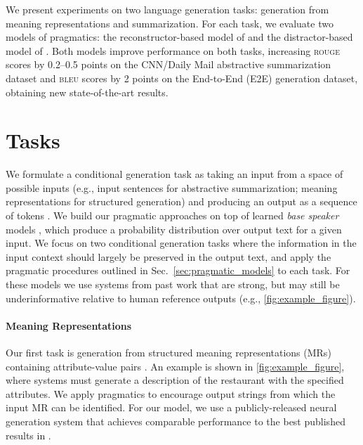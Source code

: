 \documentclass[11pt,a4paper]{article}
\newcommand{\basespk}[0]{\xspace}
\newcommand{\bleu}{\textsc{bleu}\xspace}
\newcommand{\rouge}{\textsc{rouge}\xspace}
\newcommand{\eg}{e.g., }
\begin{document}
We present experiments on two language generation tasks: 
generation from meaning representations \cite{novikova2017e2e} and summarization.
For each task, we evaluate two models of pragmatics:
the reconstructor-based model of \citet{fried2017unified} and the distractor-based 
model of \citet{cohn2018pragmatically}. Both models improve performance on both tasks, increasing \rouge scores by 0.2--0.5 points on the CNN/Daily Mail  
abstractive summarization dataset and \bleu scores by 2 points on the 
End-to-End (E2E) generation dataset, obtaining new state-of-the-art results.
 \section{Tasks}
\label{sec:tasks}

We formulate a conditional generation task as taking an input  from a space of possible inputs 
(\eg input sentences for abstractive summarization; meaning representations for structured generation) and producing an output  as a sequence of tokens . 
We build our pragmatic approaches on top of learned \emph{base speaker} models \basespk, which produce a probability distribution  
over output text for a given input.
We focus on two conditional generation tasks where the information in the input context should largely be preserved in the output text, and apply the pragmatic procedures outlined in Sec.\ \ref{sec:pragmatic_models} to each task. 
For these \basespk models we use systems from past work that are strong, but may still be underinformative relative to human reference outputs (\eg \autoref{fig:example_figure}).





\paragraph{Meaning Representations}
Our first task is generation from structured meaning representations (MRs) containing attribute-value pairs \cite{novikova2017e2e}. An example is shown in \autoref{fig:example_figure}, where systems must generate a description of the restaurant with the specified attributes. We apply pragmatics to encourage output strings from which the input MR can be identified. For our \basespk model, we use a publicly-released neural generation system \citep{puzikov2018e2e} that achieves comparable performance to the best published results in \citet{duvsek2018findings}. 
\end{document}
